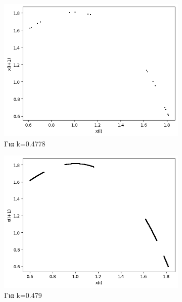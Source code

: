 \begin{figure}[h!]
\begin{subfigure}[b]{0.25\textwidth}
		\includegraphics[width=\textwidth]{LateX images/graphs/k04778}
		\caption{Για k=0.4778}
		\label{f:k5}
	\end{subfigure}
	\hfill
	\begin{subfigure}[b]{0.25\textwidth}
		\centering
		\includegraphics[width=\textwidth]{LateX images/graphs/k0479}
		\caption{Για k=0.479}
		\label{f:k6}
	\end{subfigure}
	\hfill
	\begin{subfigure}[b]{0.25\textwidth}
		\centering

\end{subfigure}
\end{figure}
